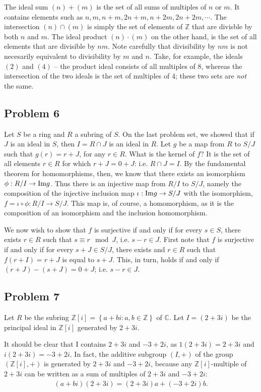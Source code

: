 \documentclass{../../mathnotes}
\begin{document}
The ideal sum $(n)+(m)$ is the set of all sums of multiples of $n$ or $m$. It contains elements such as $n, m, n+m, 2n+m,
n+2m, 2n+2m,\cdots$. The intersection $(n)\cap(m)$ is simply the set of elements of $\mathbb{Z}$ that are divisble by
both $n$ and $m$. The ideal product $(n)\cdot(m)$ on the other hand, is the set of all elements that are divisible by
$nm$. Note carefully that divisibility by $nm$ is not necesarily equivalent to divisibility by $m$ and $n$. Take, for
example, the ideals $(2)$ and $(4)$ -- the product ideal consists of all multiples of 8, whereas the intersection of
the two ideals is the set of multiples of 4; these two sets are \textit{not} the same.

\subsection*{Problem 6}

Let $S$ be a ring and $R$ a subring of $S$. On the last problem set, we showed that if $J$ is an ideal in $S$, then
$I=R\cap J$ is an ideal in $R$. Let $g$ be a map from $R$ to $S/J$ such that $g(r)=r+J$, for any $r\in R$. What is the
kernel of $f$? It is the set of all elements $r\in R$ for which $r+J=0+J$: i.e. $R\cap J=I$. By the fundamental theorem
for homomorphisms, then, we know that there exists an isomorphism $\phi:R/I\to{\rm Im} g$. Thus there is an injective map
from $R/I$ to $S/J$, namely the composition of the injective inclusion map $\iota:{\rm Im}g\to S/J$ with the isomorphism,
$f=\iota\circ\phi:R/I\to S/J$. This map is, of course, a homomorphism, as it is the composition of an isomorphism and the
inclusion homomorphism.

We now wish to show that $f$ is surjective if and only if for every $s\in S$, there exists $r\in R$ such that
$s\equiv r\mod J$, i.e. $s-r\in J$. First note that $f$ is surjective if and only if for every $s+J\in S/J$, there exists
and $r\in R$ such that $f(r+I)=r+J$ is equal to $s+J$. This, in turn, holds if and only if $(r+J)-(s+J)=0+J$; i.e.
$s-r\in J$.

\subsection*{Problem 7}

Let $R$ be the subring $\mathbb{Z}[i]=\left\{ a+bi:a,b\in\mathbb{Z} \right\}$ of $\mathbb{C}$. Let $I=(2+3i)$ be the
principal ideal in $\mathbb{Z}[i]$ generated by $2+3i$.

It should be clear that I contains $2+3i$ and $-3+2i$, as $1(2+3i)=2+3i$ and $i(2+3i)=-3+2i$. In fact, the additive subgroup
$(I,+)$ of the group $(\mathbb{Z}[i],+)$ is generated by $2+3i$ and $-3+2i$, because any $\mathbb{Z}[i]$-multiple of $2+3i$
can be written as a sum of multiples of $2+3i$ and $-3+2i$:
\begin{align*}
    (a+bi)(2+3i)=(2+3i)a+(-3+2i)b.
\end{align*}
\end{document}
